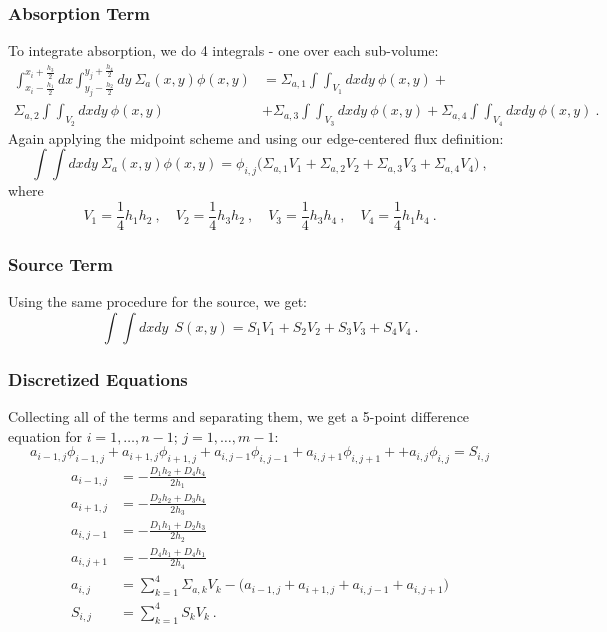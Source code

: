 \documentclass[12pt]{article}
\begin{document}
\subsubsection{Absorption Term}
To integrate absorption, we do 4 integrals - one over each sub-volume:
%
\begin{align}
\int_{x_i-\frac{h_1}{2}}^{x_i+\frac{h_3}{2}} dx \int_{y_j-\frac{h_2}{2}}^{y_j+\frac{h_4}{2}}dy\:\Sigma_a(x,y) \phi(x,y) &= \Sigma_{a,1}\int\int_{V_1} dx dy \: \phi(x,y) + \nonumber \\
%
\Sigma_{a,2}\int\int_{V_2} dx dy \: \phi(x,y) &+ \Sigma_{a,3}\int\int_{V_3} dx dy \: \phi(x,y) + \Sigma_{a,4}\int\int_{V_4} dx dy \: \phi(x,y) \:.\nonumber
\end{align}
%
Again applying the midpoint scheme and using our edge-centered flux definition:
%
\[ \int \int dx dy\:\Sigma_a(x,y) \phi(x,y) = \boxed{\phi_{i,j}\bigl(\Sigma_{a,1} V_1 + \Sigma_{a,2} V_2 + \Sigma_{a,3} V_3 + \Sigma_{a,4} V_4 \bigr) }\:, \]
%
where
\[V_1 = \frac{1}{4}h_1h_2\:, \quad V_2 = \frac{1}{4}h_3h_2\:, \quad V_3 = \frac{1}{4}h_3h_4 \:, \quad V_4 = \frac{1}{4}h_1h_4 \:.\]


\subsubsection{Source Term}
Using the same procedure for the source, we get:
\[\int \int dx dy \: \:S(x,y) = \boxed{ S_1 V_1 + S_2 V_2 + S_3 V_3 + S_4 V_4 }\:.\]


\subsubsection{Discretized Equations}
Collecting all of the terms and separating them, we get a 5-point difference equation for $i=1,\dots,n-1$; $j=1,\dots,m-1$:
%
\[a_{i-1,j}\phi_{i-1,j} + a_{i+1,j}\phi_{i+1,j} + a_{i,j-1}\phi_{i,j-1} + a_{i,j+1}\phi_{i,j+1} + + a_{i,j}\phi_{i,j} = S_{i,j} \]
%
\begin{align}
a_{i-1,j} &= -\frac{D_1 h_2 + D_4 h_4}{2h_1} \nonumber \\
a_{i+1,j} &= -\frac{D_2 h_2 + D_3 h_4}{2h_3} \nonumber \\
a_{i,j-1} &= -\frac{D_1 h_1 + D_2 h_3}{2h_2} \nonumber \\
a_{i,j+1} &= -\frac{D_4 h_1 + D_4 h_1}{2h_4} \nonumber \\
%
a_{i,j} &= \sum_{k=1}^4 \Sigma_{a,k}V_k - \bigl(a_{i-1,j} + a_{i+1,j} + a_{i,j-1} + a_{i,j+1} \bigr)\nonumber \\
%
S_{i,j} &= \sum_{k=1}^4 S_{k}V_k \:.\nonumber
\end{align}
\end{document}
